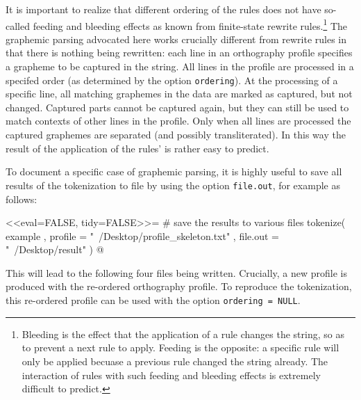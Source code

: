 It is important to realize that different ordering of the rules does not have
so-called feeding and bleeding effects as known from finite-state rewrite
rules.\footnote{Bleeding is the effect that the application of a rule changes
the string, so as to prevent a next rule to apply. Feeding is the opposite: a
specific rule will only be applied becuase a previous rule changed the string
already. The interaction of rules with such feeding and bleeding effects is
extremely difficult to predict.} The graphemic parsing advocated here works
crucially different from rewrite rules in that there is nothing being rewritten:
each line in an orthography profile specifies a grapheme to be captured in the 
string. All lines in the profile are processed in a specifed order (as determined
by the option \texttt{ordering}). At the processing of a specific line, all 
matching graphemes in the data are marked as captured, but not changed. 
Captured parts cannot be captured again, but they can still be used to match 
contexts of other lines in the profile. Only when all lines are processed the 
captured graphemes are separated (and possibly transliterated). In this way the 
result of the application of the rules' is rather easy to predict.

To document a specific case of graphemic parsing, it is highly useful to save
all results of the tokenization to file by using the option \texttt{file.out},
for example as follows: 

<<eval=FALSE, tidy=FALSE>>= 
# save the results to various files
tokenize( example
         , profile = "~/Desktop/profile_skeleton.txt"
         , file.out = "~/Desktop/result"
        )
@

This will lead to the following four files being written. Crucially, a
new profile is produced with the re-ordered orthography profile. To reproduce
the tokenization, this re-ordered profile can be used with the option
\texttt{ordering~=~NULL}.

